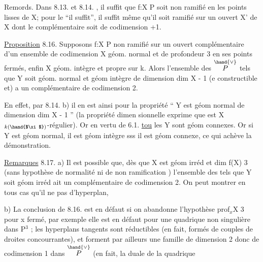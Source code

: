 

Remords. Dans 8.13. et 8.14. , il suffit  que f:X\hand{$\to$} P soit non
ramifié en les points lisses de X; pour le ``il suffit'', il suffit même
qu'il soit  ramifié sur un ouvert X' de X dont le complémentaire soit
de codimension \hand{$\geqslant$} +1.

\uline{Proposition} 8.16. Supposons f:X\hand{$\to$} P non ramifié sur un ouvert
complémentaire d'un ensemble de codimension  X géom. normal et
de profondeur\hand{$\geqslant$} 3 en ses points fermés, enfin X géom. intègre et propre
sur k. Alors l'ensemble des \hand{$\xi \in$} $\overset{\hand{\vee}}{P}$ tels que 
Y\hand{$_\xi$} soit géom. normal et géom intègre de dimension dim X - 1 (e
constructible et) a un complémentaire de codimension \hand{$\geqslant$} 2.

En effet, par 8.14. b) il en est ainsi pour la propriété
`` Y\hand{$_\xi$} est géom normal de dimension dim X - 1 '' (la propriété dimen
sionnelle exprime que \hand{$\phi_\xi$} est X$_{k(\hand{$\xi$})}$-régulier). Or en vertu de 6.1.
\uline{tou} les Y\hand{$_\xi$} sont géom connexes. Or si Y\hand{$_\xi$} est géom normal, il est
géom intègre sss il est géom connexe, ce qui achève la démonstration.

\uline{Remarques} 8.17. a)  Il est possible que, dès que X est géom irréd
et dim f(X) \hand{$\geqslant$} 3 (sans hypothèse de normalité ni de non ramification )
l'ensemble des \hand{$\xi$} tels que Y\hand{$_\xi$} soit géom irréd ait un complémentaire
de codimension \hand{$\geqslant$}2. On peut montrer en tous cas qu'il ne pas
d'hyperplan, 

b) La conclusion de 8.16. est en défaut si on abandonne
l'hypothèse prof$_x$X \hand{$\geqslant$} 3 pour x fermé, par exemple elle est en défaut pour
une quadrique non singulière  dans P$^3$ ;   les hyperplans tangents
 sont  réductibles (en fait, formés de couples de droites
concourrantes), et forment par ailleurs une famille de dimension 2
 donc de codimension 1 dans $\overset{\hand{\vee}}{P}$ (en fait, la duale de la quadrique  
